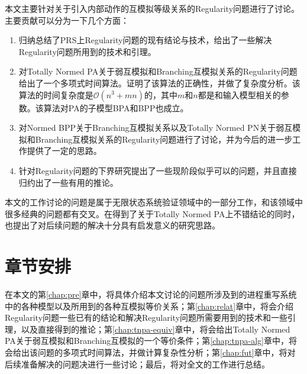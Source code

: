 本文主要针对关于引入内部动作的互模拟等级关系的Regularity问题进行了讨论。主要贡献可以分为一下几个方面：

\begin{enumerate}
	\item 归纳总结了PRS上Regularity问题的现有结论与技术，给出了一些解决Regularity问题所用到的技术和引理。
	\item 对Totally Normed PA关于弱互模拟和Branching互模拟关系的Regularity问题给出了一个多项式时间算法。证明了该算法的正确性，并做了复杂度分析。该算法的时间复杂度是$\mathscr{O}(n^3+mn)$的，其中$m$和$n$都是和输入模型相关的参数。该算法对PA的子模型BPA和BPP也成立。
	\item 对Normed BPP关于Branching互模拟关系以及Totally Normed PN关于弱互模拟和Branching互模拟关系的Regularity问题进行了讨论，并为今后的进一步工作提供了一定的思路。
	\item 针对Regularity问题的下界研究提出了一些现阶段似乎可以的问题，并且直接归约出了一些有用的推论。
\end{enumerate}

本文的工作讨论的问题是属于无限状态系统验证领域中的一部分工作，和该领域中很多经典的问题都有交叉。在得到了关于Totally Normed PA上不错结论的同时，也提出了对后续问题的解决十分具有启发意义的研究思路。

\section{章节安排}
\label{sec:section}

在本文的第\ref{chap:pre}章中，将具体介绍本文讨论的问题所涉及到的进程重写系统中的各种模型以及所用到的各种互模拟等价关系；第\ref{chap:relat}章中，将会介绍Regularity问题一些已有的结论和解决Regularity问题所需要用到的技术和一些引理，以及直接得到的推论；第\ref{chap:tnpa-equiv}章中，将会给出Totally Normed PA关于弱互模拟和Branching互模拟的一个等价条件；第\ref{chap:tnpa-alg}章中，将会给出该问题的多项式时间算法，并做计算复杂性分析；第\ref{chap:fut}章中，将对后续准备解决的问题决进行一些讨论；最后，将对全文的工作进行总结。
